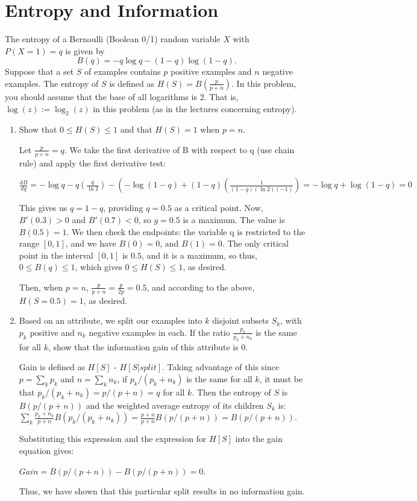 \documentclass[11pt]{article}
\newcommand{\sol}[1]{{\bf{\color{magenta}{{Solution:}}}}}
\begin{document}
\section{Entropy and Information }
The entropy of a Bernoulli (Boolean 0/1) random variable $X$ with $P(X = 1) = q$ is given by
\begin{equation*}
B(q) = - q \log q - (1 - q) \log(1 - q).
\end{equation*}
Suppose that a set $S$ of examples contains $p$ positive examples and $n$ negative examples. The entropy of $S$ is defined as $H(S) = B\left(\frac{p}{p+n}\right)$. In this problem, you should assume that the base of all logarithms is 2. That is, $\log(z) := \log_2(z)$ in this problem (as in the lectures concerning entropy).
\begin{enumerate}
\item {} Show that $0 \le H(S)\le 1$ and that $H(S) = 1$  when $p = n$.

\sol x Let $\frac{p}{p + n} = q$. We take the first derivative of B with respect to q (use chain rule) and apply the first derivative test:

$\frac{dB}{dq} = -\log q - q \left(\frac{q}{\ln 2}\right) - \left(-\log\left(1-q\right) + \left(1-q\right)\left(\frac{1}{(1-q)(\ln 2)(-1)}\right) = -\log q + \log\left(1-q\right) = 0$

This gives us $q = 1-q$, providing $q = 0.5$ as a critical point. Now, $B'(0.3) > 0$ and $B'(0.7) < 0$, so $g=0.5$ is a maximum. The value is $B(0.5) = 1$. We then check the endpoints: the variable q is restricted to the range $[0,1]$, and we have $B(0) = 0$, and $B(1) = 0$. The only critical point in the interval $[0, 1]$ is $0.5$, and it is a maximum, so thus, $0 \le B(q) \le 1$, which gives $0 \le H(S) \le 1$, as desired.

Then, when $p = n$, $\frac{p}{p + n} = \frac{p}{2p} = 0.5$, and according to the above, $H(S = 0.5) = 1$, as desired.

\item {} Based on an attribute, we split our examples into $k$ disjoint subsets $S_k$, with $p_k$ positive and $n_k$ negative examples in each. If the ratio $\tfrac{p_k}{p_k + n_k}$ is the same for all $k$, show that the information gain of this attribute is 0.

\sol x Gain is defined as $H[S]$ - $H[S | split]$. Taking advantage of this since $p = \sum_{k} p_k$ and $n = \sum_{k} n_k$, if $p_k/(p_k + n_k)$ is the same for all $k$, it must be that $p_k/(p_k + n_k) = p/(p + n) = q$ for all $k$. Then the entropy of $S$ is $B(p/(p + n))$ and the weighted average entropy of its children $S_k$ is: $\sum_{k} \frac{p_k + n_k}{p + n} B(p_k/(p_k + n_k)) = \frac{p + n}{p + n} B(p/(p + n)) = B(p/(p + n))$.

Substituting this expression and the expression for $H[S]$ into the gain equation gives:

$Gain = B(p/(p + n)) - B(p/(p + n)) = 0$.

Thus, we have shown that this particular split results in no information gain.

\end{enumerate}
\end{document}
